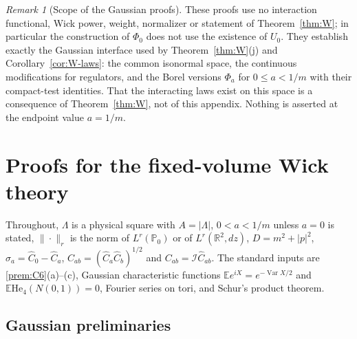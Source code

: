 \documentclass[11pt]{article}
\theoremstyle{plain}
\theoremstyle{definition}
\theoremstyle{remark}
\newtheorem{remark}[theorem]{Remark}
\newcommand{\R}{\mathbb{R}}
\newcommand{\E}{\mathbb{E}}
\newcommand{\PP}{\mathbb{P}}
\newcommand{\cI}{\mathcal{I}}
\DeclareMathOperator{\Var}{Var}
\begin{document}
\begin{remark}[Scope of the Gaussian proofs]\label{rem:G-proofscope}
These proofs use no interaction functional, Wick power, weight, normalizer or
statement of Theorem~\ref{thm:W}; in particular the construction of $\Phi_0$ does not
use the existence of $U_0$. They establish exactly the Gaussian interface used by
Theorem~\ref{thm:W}(j) and Corollary~\ref{cor:W-laws}: the common isonormal space, the
continuous modifications for regulators, and the Borel versions $\Phi_a$ for
$0\le a<1/m$ with their compact-test identities. That the interacting laws exist
on this space is a consequence of Theorem~\ref{thm:W}, not of this appendix.
Nothing is asserted at the endpoint value $a=1/m$.
\end{remark}

\section{Proofs for the fixed-volume Wick theory}\label{app:W}

Throughout, $\Lambda$ is a physical square with $A=|\Lambda|$, $0<a<1/m$ unless $a=0$ is stated,
$\|\cdot\|_r$ is the norm of $L^{r}(\PP_0)$ or of $L^{r}(\R^{2},dz)$, $D=m^{2}+|p|^{2}$,
$\sigma_a=\hat C_0-\hat C_a$, $\hat C_{ab}=(\hat C_a\hat C_b)^{1/2}$ and $C_{ab}=\cI\hat C_{ab}$. The standard inputs are
\ref{prem:C6}(a)--(c), Gaussian characteristic functions
$\E e^{iX}=e^{-\Var X/2}$ and $\E\mathrm{He}_4(N(0,1))=0$, Fourier series on tori, and Schur's product
theorem.

\subsection{Gaussian preliminaries}
\end{document}
